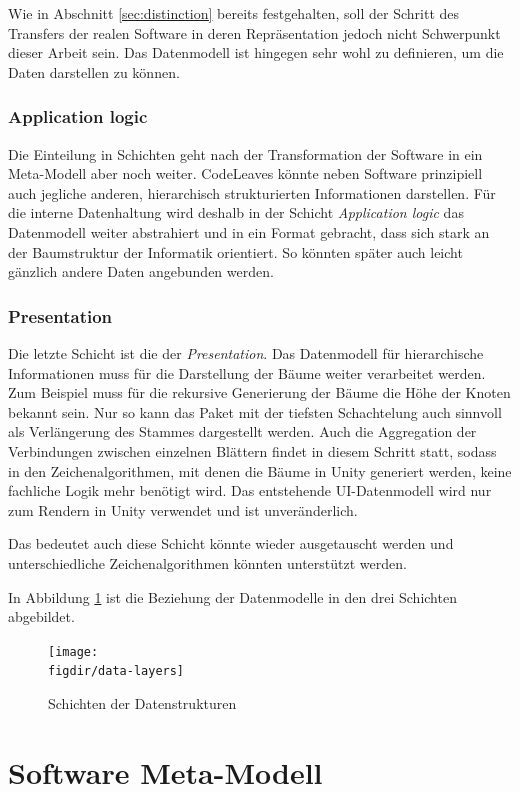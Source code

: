 Wie in Abschnitt \ref{sec:distinction} bereits festgehalten, soll der Schritt des Transfers der realen Software in deren Repräsentation jedoch nicht Schwerpunkt dieser Arbeit sein. Das Datenmodell ist hingegen sehr wohl zu definieren, um die Daten darstellen zu können.

\subsubsection*{Application logic}
Die Einteilung in Schichten geht nach der Transformation der Software in ein Meta-Modell aber noch weiter. CodeLeaves könnte neben Software prinzipiell auch jegliche anderen, hierarchisch strukturierten Informationen darstellen. Für die interne Datenhaltung wird deshalb in der Schicht \textit{Application logic} das Datenmodell weiter abstrahiert und in ein Format gebracht, dass sich stark an der Baumstruktur der Informatik orientiert. So könnten später auch leicht gänzlich andere Daten angebunden werden.

\subsubsection*{Presentation}
Die letzte Schicht ist die der \textit{Presentation}. Das Datenmodell für hierarchische Informationen muss für die Darstellung der Bäume weiter verarbeitet werden. Zum Beispiel muss für die rekursive Generierung der Bäume die Höhe der Knoten bekannt sein. Nur so kann das Paket mit der tiefsten Schachtelung auch sinnvoll als Verlängerung des Stammes dargestellt werden. Auch die Aggregation der Verbindungen zwischen einzelnen Blättern findet in diesem Schritt statt, sodass in den Zeichenalgorithmen, mit denen die Bäume in Unity generiert werden, keine fachliche Logik mehr benötigt wird. Das entstehende UI-Datenmodell wird nur zum Rendern in Unity verwendet und ist unveränderlich.

Das bedeutet auch diese Schicht könnte wieder ausgetauscht werden und unterschiedliche Zeichenalgorithmen könnten unterstützt werden.

In Abbildung \ref{fig:data-layers} ist die Beziehung der Datenmodelle in den drei Schichten abgebildet.

\begin{figure}[htb]
  \texttt{[image: \\figdir/data-layers]}
  \caption{Schichten der Datenstrukturen}
  \label{fig:data-layers}
\end{figure}

\section{Software Meta-Modell}
\label{sec:software-model}

